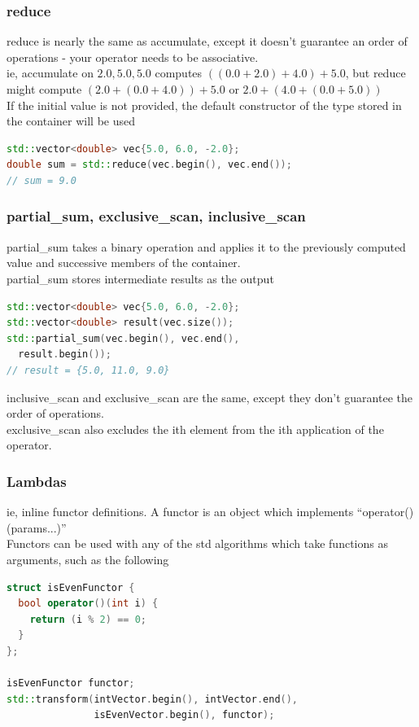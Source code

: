 \documentclass{beamer}
\begin{document}
\begin{frame}[fragile]
  \frametitle{reduce}
  reduce is nearly the same as accumulate, except it doesn't guarantee an order of operations
  - your operator needs to be associative.\\
  ie, accumulate on ${2.0, 5.0, 5.0}$ computes $((0.0 + 2.0) + 4.0) + 5.0$,
  but reduce might compute $(2.0 + (0.0 + 4.0)) + 5.0$ or $2.0 + (4.0 + (0.0 + 5.0))$\\
  If the initial value is not provided, the default constructor of the type stored in the container will be used
  \begin{lstlisting}[language=C++]
std::vector<double> vec{5.0, 6.0, -2.0};
double sum = std::reduce(vec.begin(), vec.end());
// sum = 9.0
  \end{lstlisting}
\end{frame}

\begin{frame}[fragile]
  \frametitle{partial\_sum, exclusive\_scan, inclusive\_scan}
  partial\_sum takes a binary operation and applies it to the
  previously computed value and successive members of the container.\\
  partial\_sum stores intermediate results as the output\\

  \begin{lstlisting}[language=C++]
std::vector<double> vec{5.0, 6.0, -2.0};
std::vector<double> result(vec.size());
std::partial_sum(vec.begin(), vec.end(),
  result.begin());
// result = {5.0, 11.0, 9.0}
  \end{lstlisting}
  inclusive\_scan and exclusive\_scan are the same, except they don't guarantee the order of operations.\\
  exclusive\_scan also excludes the ith element from the ith application of the operator.
\end{frame}

\begin{frame}[fragile]
  \frametitle{Lambdas}
  ie, inline functor definitions. A functor is an object which implements ``operator()(params...)''\\
  Functors can be used with any of the std algorithms which take functions as arguments, such as the following

  \begin{lstlisting}[language=C++]
struct isEvenFunctor {
  bool operator()(int i) {
    return (i % 2) == 0;
  }
};

isEvenFunctor functor;
std::transform(intVector.begin(), intVector.end(),
               isEvenVector.begin(), functor);
  \end{lstlisting}
\end{frame}
\end{document}
